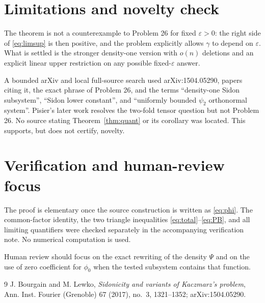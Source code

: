 \documentclass[11pt]{article}
\begin{document}
\section{Limitations and novelty check}

The theorem is not a counterexample to Problem 26 for fixed
$\varepsilon>0$: the right side of \eqref{eq:limsup} is then positive, and
the problem explicitly allows $\gamma$ to depend on $\varepsilon$.  What is
settled is the stronger density-one version with $o(n)$ deletions and an
explicit linear upper restriction on any possible fixed-$\varepsilon$ answer.

A bounded arXiv and local full-source search used arXiv:1504.05290, papers
citing it, the exact phrase of Problem 26, and the terms ``density-one Sidon
subsystem'', ``Sidon lower constant'', and ``uniformly bounded $\psi_2$
orthonormal system''.  Pisier's later work resolves the two-fold tensor
question but not Problem 26.  No source stating Theorem~\ref{thm:quant} or
its corollary was located.  This supports, but does not certify, novelty.

\section{Verification and human-review focus}

The proof is elementary once the source construction is written as
\eqref{eq:phi}.  The common-factor identity, the two triangle inequalities
\eqref{eq:total}--\eqref{eq:PB}, and all limiting quantifiers were checked
separately in the accompanying verification note.  No numerical computation
is used.

Human review should focus on the exact rewriting of the density $\Psi$ and on
the use of zero coefficient for $\phi_0$ when the tested subsystem contains
that function.

\begin{thebibliography}{9}
J. Bourgain and M. Lewko,
\emph{Sidonicity and variants of Kaczmarz's problem},
Ann. Inst. Fourier (Grenoble) 67 (2017), no.~3, 1321--1352;
arXiv:1504.05290.
\end{thebibliography}
\end{document}
